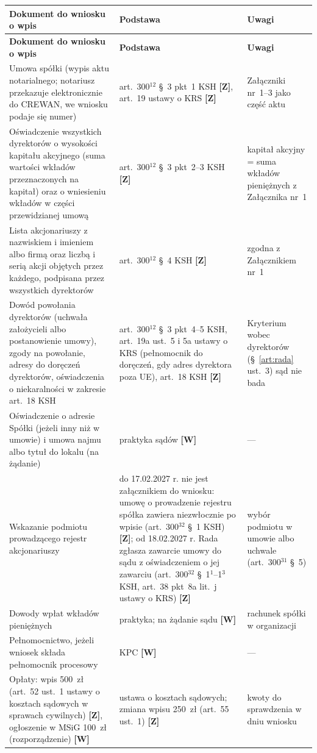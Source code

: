 \documentclass[12pt,a4paper]{report}
\newcommand{\Wiar}[1]{\textbf{[#1]}}
\begin{document}
\begin{longtable}{@{}p{5.6cm} p{4.2cm} p{4.4cm}@{}}
\toprule
\textbf{Dokument do wniosku o wpis} & \textbf{Podstawa} & \textbf{Uwagi} \\
\midrule
\endfirsthead
\toprule
\textbf{Dokument do wniosku o wpis} & \textbf{Podstawa} & \textbf{Uwagi} \\
\midrule
\endhead
Umowa spółki (wypis aktu notarialnego; notariusz przekazuje elektronicznie do CREWAN, we wniosku podaje się numer) & art.~300$^{12}$ §~3 pkt~1 KSH \Wiar{Z}, art.~19 ustawy o KRS \Wiar{Z} & Załączniki nr~1--3 jako część aktu \\
Oświadczenie wszystkich dyrektorów o wysokości kapitału akcyjnego (suma wartości wkładów przeznaczonych na kapitał) oraz o wniesieniu wkładów w części przewidzianej umową & art.~300$^{12}$ §~3 pkt~2--3 KSH \Wiar{Z} & kapitał akcyjny = suma wkładów pieniężnych z Załącznika nr~1 \\
Lista akcjonariuszy z nazwiskiem i imieniem albo firmą oraz liczbą i serią akcji objętych przez każdego, podpisana przez wszystkich dyrektorów & art.~300$^{12}$ §~4 KSH \Wiar{Z} & zgodna z Załącznikiem nr~1 \\
Dowód powołania dyrektorów (uchwała założycieli albo postanowienie umowy), zgody na powołanie, adresy do doręczeń dyrektorów, oświadczenia o niekaralności w zakresie art.~18 KSH & art.~300$^{12}$ §~3 pkt~4--5 KSH, art.~19a ust.~5 i 5a ustawy o KRS (pełnomocnik do doręczeń, gdy adres dyrektora poza UE), art.~18 KSH \Wiar{Z} & Kryterium wobec dyrektorów (§~\ref{art:rada} ust.~3) sąd nie bada \\
Oświadczenie o adresie Spółki (jeżeli inny niż w umowie) i umowa najmu albo tytuł do lokalu (na żądanie) & praktyka sądów \Wiar{W} & --- \\
Wskazanie podmiotu prowadzącego rejestr akcjonariuszy & do 17.02.2027 r. nie jest załącznikiem do wniosku: umowę o prowadzenie rejestru spółka zawiera niezwłocznie po wpisie (art.~300$^{32}$ §~1 KSH) \Wiar{Z}; od 18.02.2027 r. Rada zgłasza zawarcie umowy do sądu z oświadczeniem o jej zawarciu (art.~300$^{32}$ §~1$^{1}$--1$^{3}$ KSH, art.~38 pkt~8a lit.~j ustawy o KRS) \Wiar{Z} & wybór podmiotu w umowie albo uchwale (art.~300$^{31}$ §~5) \\
Dowody wpłat wkładów pieniężnych & praktyka; na żądanie sądu \Wiar{W} & rachunek spółki w organizacji \\
Pełnomocnictwo, jeżeli wniosek składa pełnomocnik procesowy & KPC \Wiar{W} & --- \\
Opłaty: wpis 500~zł (art.~52 ust.~1 ustawy o kosztach sądowych w sprawach cywilnych) \Wiar{Z}, ogłoszenie w MSiG 100~zł (rozporządzenie) \Wiar{W} & ustawa o kosztach sądowych; zmiana wpisu 250~zł (art.~55 ust.~1) \Wiar{Z} & kwoty do sprawdzenia w dniu wniosku \\
\bottomrule
\end{longtable}
\end{document}
